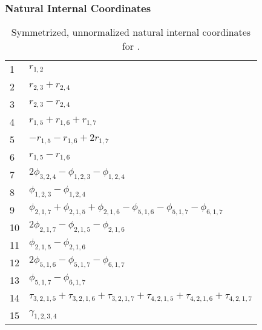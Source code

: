 \documentclass[10pt,oneside]{article}
\begin{document}
\clearpage

\subsubsection*{Natural Internal Coordinates}
\begin{table}[h!]
\centering
\caption{Symmetrized, unnormalized natural internal coordinates for .}
\small
\begin{tabular}{ll}
  1   & $r_{1,2}$ \\
  2   & $r_{2,3} + r_{2,4}$ \\
  3   & $r_{2,3} - r_{2,4}$ \\
  4   & $r_{1,5} + r_{1,6} + r_{1,7}$ \\
  5   & $-r_{1,5} - r_{1,6} + 2r_{1,7}$ \\
  6   & $r_{1,5} - r_{1,6}$ \\
  7   & $2\phi_{3,2,4} - \phi_{1,2,3} - \phi_{1,2,4}$ \\
  8   & $\phi_{1,2,3} - \phi_{1,2,4}$ \\
  9   & $\phi_{2,1,7} + \phi_{2,1,5} + \phi_{2,1,6} - \phi_{5,1,6} - \phi_{5,1,7} - \phi_{6,1,7}$ \\
  10  & $2\phi_{2,1,7} - \phi_{2,1,5} - \phi_{2,1,6}$ \\
  11  & $\phi_{2,1,5} - \phi_{2,1,6}$ \\
  12  & $2\phi_{5,1,6} - \phi_{5,1,7} - \phi_{6,1,7}$ \\
  13  & $\phi_{5,1,7} - \phi_{6,1,7}$ \\
  14  & $\tau_{3,2,1,5} + \tau_{3,2,1,6} + \tau_{3,2,1,7} + \tau_{4,2,1,5} + \tau_{4,2,1,6} + \tau_{4,2,1,7}$ \\
  15  & $\gamma_{1,2,3,4}$ \\
\end{tabular}
\end{table}

\clearpage

\subsection{\ \ \ }
\end{document}
